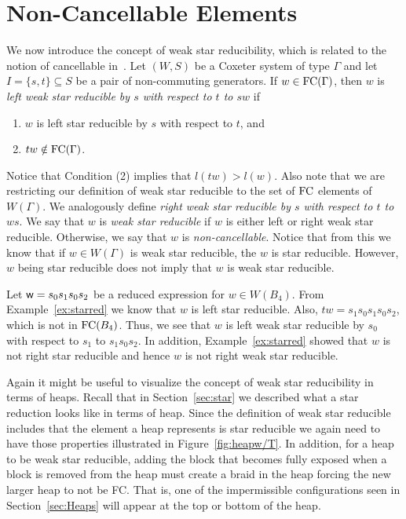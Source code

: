 

\section{Non-Cancellable Elements}\label{sec:noncancel}
 
We now introduce the concept of weak star reducibility, which is related to the notion of cancellable in~\cite{Fan1997}. Let $(W,S)$ be a Coxeter system of type $\Gamma$ and let $I=\{s,t\} \subseteq S$ be a pair of non-commuting generators. If $w  \in \mathrm{FC}(\Gamma)$, then $w$ is \emph{left weak star reducible by $s$ with respect to $t$ to $sw$} if
\begin{enumerate}[leftmargin=2cm]
\item $w$ is left star reducible by $s$ with respect to $t$, and
\item $tw \notin \mathrm{FC}(\Gamma)$.	
\end{enumerate}
Notice that Condition (2) implies that $l(tw)>l(w)$. Also note that we are restricting our definition of weak star reducible to the set of $\mathrm{FC}$ elements of $W(\Gamma)$. We analogously define \emph{right weak star reducible by $s$ with respect to $t$ to $ws$}. We say that $w$ is \emph{weak star reducible} if $w$ is either left or right weak star reducible. Otherwise, we say that $w$ is \emph{non-cancellable}. Notice that from this we know that if $w \in W(\Gamma)$ is weak star reducible, the $w$ is star reducible. However, $w$ being star reducible does not imply that $w$ is weak star reducible.

\begin{example}\label{ex:noncancel}
 Let $\mathsf{w}=s_0s_1s_0s_2$ be a reduced expression for $w \in W(B_4)$. From Example~\ref{ex:starred} we know that $w$ is left star reducible. Also, $tw=s_1s_0s_1s_0s_2$, which is not in $\mathrm{FC}(B_4)$. Thus, we see that $w$ is left weak star reducible by $s_0$ with respect to $s_1$ to $s_1s_0s_2$. In addition, Example~\ref{ex:starred} showed that $w$ is not right star reducible and hence $w$ is not right weak star reducible. 
\end{example}

Again it might be useful to visualize the concept of weak star reducibility in terms of heaps. Recall that in Section~\ref{sec:star} we described what a star reduction looks like in terms of heap. Since the definition of weak star reducible includes that the element a heap represents is star reducible we again need to have those properties illustrated in Figure~\ref{fig:heapw/T}. In addition, for a heap to be weak star reducible, adding the block that becomes fully exposed when a block is removed from the heap must create a braid in the heap forcing the new larger heap to not be FC. That is, one of the impermissible configurations seen in Section~\ref{sec:Heaps} will appear at the top or bottom of the heap.

